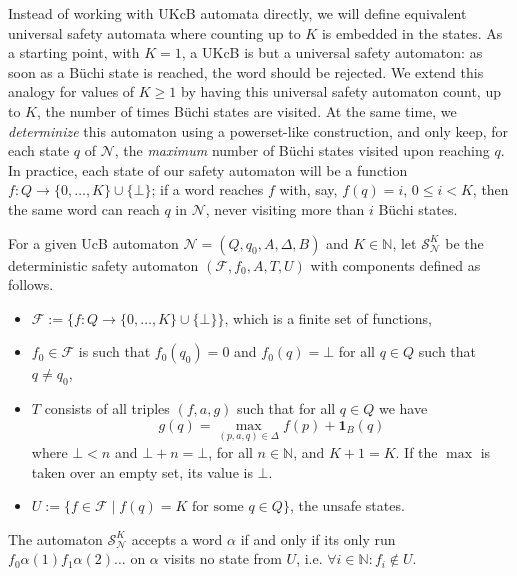 \documentclass[runningheads,a4paper,draft]{llncs}
\newcommand{\indicator}[2]{\mathbf{1}_{#1}(#2)}
\newcommand{\calF}{\mathcal{F}}
\newcommand{\calN}{\mathcal{N}}
\newcommand{\calS}{\mathcal{S}}
\begin{document}
Instead of working with UKcB automata directly, we will define equivalent
universal safety automata where counting up to \(K\) is embedded in the states.
As a starting point, with \(K = 1\), a UKcB is but a universal safety automaton:
as soon as a B\"uchi state is reached, the word should be
rejected. We extend this analogy for values
of \(K \geq 1\) by having this universal safety automaton count, up to \(K\), the
number of times B\"uchi states are visited.  At the same time, we
\emph{determinize} this automaton using a powerset-like construction, and only
keep, for each state \(q\) of \(\calN\), the \emph{maximum} number of B\"uchi
states visited upon reaching \(q\).  In practice, each state of our
safety automaton will be a function
\(f\colon Q \to \{0, \dots, K\} \cup \{\bot\}\); if a word reaches \(f\) with, say,
\(f(q) = i\), \(0 \leq i < K \), then the same word can reach \(q\) in
\(\calN\), never visiting more than \(i\) B\"uchi states.
\begin{definition}
  For a given UcB automaton $\calN = (Q,q_0,A,\Delta,B)$ and $K \in \mathbb{N}$,
  let $\calS^K_\calN$ be the deterministic safety
  automaton $(\calF,f_0,A,T,U)$ with components defined as follows.
  \begin{itemize}
    \item $\calF := \{f \colon Q \to \{0,\dots,K \} \cup
      \{\bot\}\}$,
      which is a finite set of functions,
    \item $f_0 \in \calF$ is such that $f_0(q_0) = 0$ and $f_0(q) =
      \bot$ for all $q \in Q$ such that $q \neq q_0$,
    \item $T$ consists of all triples $(f,a,g)$ such that for all $q \in Q$ we
      have
      \[
        g(q) = \max_{(p,a,q) \in \Delta}
        f(p) + \indicator{B}{q}
      \]
      where $\bot < n$ and $\bot + n = \bot$, for all $n \in \mathbb{N}$, and
      $K + 1 = K$.  If the \(\max\) is taken over an empty set, its value is \(\bot\).
    \item $U := \{ f \in \calF \mid f(q) = K \text{ for
      some } q \in Q \}$, the unsafe states.
  \end{itemize}
  The automaton $\calS^K_\calN$ accepts a word $\alpha$ if and only if its only
  run $f_0 \alpha(1) f_1 \alpha(2) \dots$ on $\alpha$ visits no state from $U$,
  i.e. $\forall i \in \mathbb{N} : f_i \not\in U$.
\end{definition}
\end{document}
